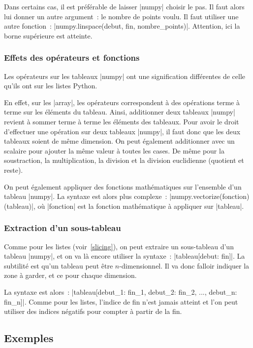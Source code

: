 		Dans certains cas, il est préférable de laisser \python|numpy| choisir le pas. Il faut alors lui donner un autre argument~: le nombre de points voulu.
		Il faut utiliser une autre fonction~: \python|numpy.linspace(debut, fin, nombre_points)|. Attention, ici la borne supérieure est atteinte.
	
		\subsubsection{Effets des opérateurs et fonctions}
		Les opérateurs sur les tableaux \python|numpy| ont une signification différentes de celle qu'ils ont sur les listes Python.
		
		En effet, sur les \python|array|, les opérateurs correspondent à des opérations terme à terme sur les éléments du tableau. Ainsi, additionner deux tableaux \python|numpy| revient à sommer terme à terme les éléments des tableaux. Pour avoir le droit d'effectuer une opération sur deux tableaux \python|numpy|, il faut donc que les deux tableaux soient de même dimension.
		On peut également additionner avec un scalaire pour ajouter la même valeur à toutes les cases. De même pour la soustraction, la multiplication, la division et la division euclidienne (quotient et reste).
		
		On peut également appliquer des fonctions mathématiques sur l'ensemble d'un tableau \python|numpy|.
		La syntaxe est alors plus complexe~: \python|numpy.vectorize(fonction)(tableau)|, où \python|fonction| est la fonction mathématique à appliquer sur \python|tableau|.
		
		\subsubsection{Extraction d'un sous-tableau}
		Comme pour les listes (voir~\ref{slicing}), on peut extraire un sous-tableau d'un tableau \python|numpy|, et on va là encore utiliser la syntaxe~: \python|tableau[debut: fin]|.
		La subtilité est qu'un tableau peut être $n$-dimensionnel. Il va donc falloir indiquer la zone à garder, et ce pour chaque dimension.
		
		La syntaxe est alors~: \python|tableau[debut_1: fin_1, debut_2: fin_2, ..., debut_n: fin_n]|.
		Comme pour les listes, l'indice de fin n'est jamais atteint et l'on peut utiliser des indices négatifs pour compter à partir de la fin.		
	
	\subsection{Exemples}
		
